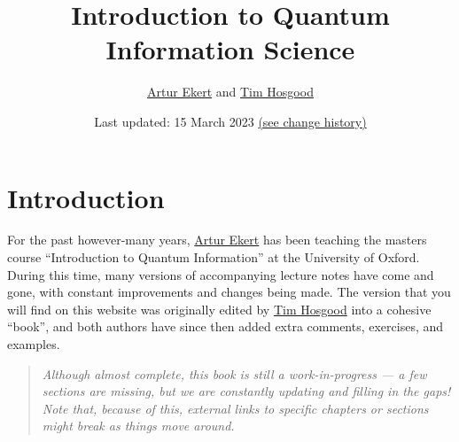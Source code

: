 \documentclass[fleqn]{article}
\title{Introduction to Quantum Information Science}
\author{\href{https://www.arturekert.org/}{Artur Ekert} and \href{https://thosgood.com}{Tim Hosgood}}
\date{Last updated: 15 March 2023 \href{https://github.com/thosgood/qubit.guide/commits/main}{(see change history)}}
\renewcommand{\leq}{\leqslant}
\renewcommand{\geq}{\geqslant}
\let\oldsection\section
\renewcommand\section{\clearpage\oldsection}
\begin{document}
\setcounter{tocdepth}{2}
\maketitle

\hypertarget{introduction}{%
\section*{Introduction}\label{introduction}}

\providecommand{\xmapsto}[1]{\overset{#1}{\longmapsto}}
\providecommand{\bra}[1]{\langle#1|}
\providecommand{\ket}[1]{|#1\rangle}
\providecommand{\braket}[2]{\langle#1|#2\rangle}
\providecommand{\proj}[1]{|#1\rangle\langle#1|}
\providecommand{\av}[1]{\langle#1\rangle}
\providecommand{\tr}{\operatorname{tr}}
\providecommand{\id}{\mathbf{1}}
\providecommand{\diag}[2]{\begin{bmatrix}#1&0\\0&#2\end{bmatrix}}
\providecommand{\smalldiag}[2]{\left(\begin{smallmatrix}#1&0\\0&#2\end{smallmatrix}\right)}
\providecommand{\mqty}[1]{\begin{matrix}#1\end{matrix}}
\providecommand{\bmqty}[1]{\begin{bmatrix}#1\end{bmatrix}}
\renewcommand{\leq}{\leqslant}
\renewcommand{\geq}{\geqslant}

For the past however-many years, \href{https://www.arturekert.com/}{Artur Ekert} has been teaching the masters course ``Introduction to Quantum Information'' at the University of Oxford.
During this time, many versions of accompanying lecture notes have come and gone, with constant improvements and changes being made.
The version that you will find on this website was originally edited by \href{https://thosgood.com}{Tim Hosgood} into a cohesive ``book'', and both authors have since then added extra comments, exercises, and examples.

\begin{quote}
\emph{Although almost complete, this book is still a work-in-progress --- a few sections are missing, but we are constantly updating and filling in the gaps!}
\emph{Note that, because of this, external links to specific chapters or sections might break as things move around.}
\end{quote}
\end{document}
